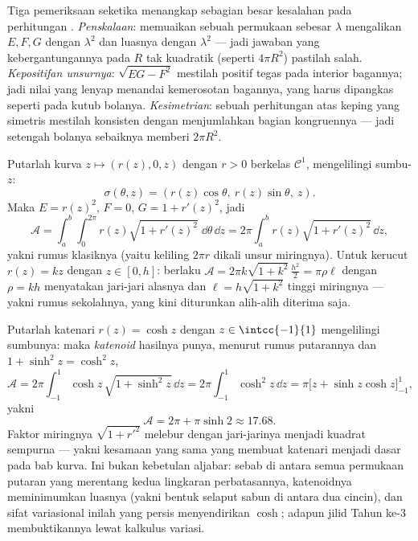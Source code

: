 \begin{remark}
Tiga pemeriksaan seketika menangkap sebagian besar kesalahan pada perhitungan
. \emph{Penskalaan}: memuaikan sebuah permukaan sebesar $\lambda$
mengalikan $E, F, G$ dengan $\lambda^2$ dan luasnya dengan
$\lambda^2$ --- jadi jawaban yang kebergantungannya pada $R$ tak
kuadratik (seperti $4\pi R^2$) pastilah salah. \emph{Kepositifan
unsurnya}: $\sqrt{EG - F^2}$ mestilah positif tegas pada
interior bagannya; jadi nilai yang lenyap menandai kemerosotan bagannya,
yang harus dipangkas seperti pada kutub bolanya. \emph{Kesimetrian}: sebuah
perhitungan atas keping yang simetris mestilah konsisten dengan
menjumlahkan bagian kongruennya --- jadi setengah bolanya sebaiknya
memberi $2\pi R^2$.
\end{remark}

\begin{example}\label{ex:b2:surfaces:revolution}
Putarlah kurva $z \mapsto (r(z), 0, z)$ dengan $r > 0$ berkelas
$\mathcal{C}^1$, mengelilingi sumbu-$z$:
\[
\sigma(\theta, z) = (r(z)\cos\theta,\ r(z)\sin\theta,\ z).
\]
Maka $E = r(z)^2$, $F = 0$, $G = 1 + r'(z)^2$, jadi
\[
\mathcal{A} = \int_a^b\!\!\int_0^{2\pi}
r(z)\sqrt{1 + r'(z)^2}\;\dd\theta\,\dd z
= 2\pi\int_a^b r(z)\sqrt{1 + r'(z)^2}\,\dd z ,
\]
yakni rumus klasiknya (yaitu keliling $2\pi r$ dikali unsur 
miringnya). Untuk kerucut $r(z) = kz$ dengan $z \in [0, h]$: berlaku $\mathcal
A = 2\pi k\sqrt{1 + k^2}\,\frac{h^2}{2} = \pi \rho \ell$ dengan
$\rho = kh$ menyatakan jari-jari alasnya dan $\ell = h\sqrt{1 + k^2}$ tinggi
miringnya --- yakni rumus sekolahnya, yang kini diturunkan alih-alih diterima saja.
\end{example}

\begin{example}[Katenoidnya]\label{ex:b2:surfaces:catenoid}
Putarlah katenari $r(z) = \cosh z$ dengan $z \in \intcc{-1}{1}$
mengelilingi sumbunya: maka \emph{katenoid} hasilnya punya, menurut
rumus putarannya dan $1 + \sinh^2 z = \cosh^2 z$,
\[
\mathcal A = 2\pi\int_{-1}^1\cosh z\,\sqrt{1 + \sinh^2z}\,
\dd z = 2\pi\int_{-1}^1\cosh^2z\,\dd z
= \pi\bigl[z + \sinh z\cosh z\bigr]_{-1}^{1},
\]
yakni
\[
\mathcal A = 2\pi + \pi\sinh 2 \approx 17.68 .
\]
Faktor miringnya $\sqrt{1 + r'^2}$ melebur dengan jari-jarinya
menjadi kuadrat sempurna --- yakni kesamaan yang sama yang membuat
 katenari menjadi dasar pada bab kurva. Ini
bukan kebetulan aljabar: sebab di antara semua permukaan putaran
yang merentang kedua lingkaran perbatasannya, katenoidnya meminimumkan
luasnya (yakni bentuk selaput sabun di antara dua cincin), dan
sifat variasional inilah yang persis menyendirikan
$\cosh$; adapun jilid Tahun ke-3 membuktikannya lewat kalkulus
variasi.
\end{example}

